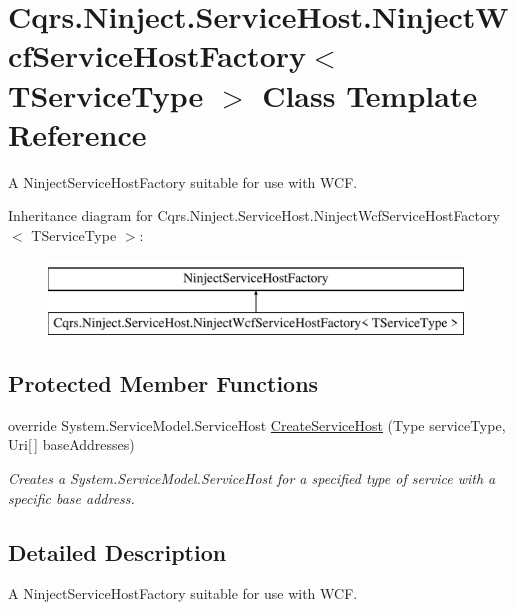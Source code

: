 \hypertarget{classCqrs_1_1Ninject_1_1ServiceHost_1_1NinjectWcfServiceHostFactory}{}\section{Cqrs.\+Ninject.\+Service\+Host.\+Ninject\+Wcf\+Service\+Host\+Factory$<$ T\+Service\+Type $>$ Class Template Reference}
\label{classCqrs_1_1Ninject_1_1ServiceHost_1_1NinjectWcfServiceHostFactory}


A Ninject\+Service\+Host\+Factory suitable for use with W\+CF.  


Inheritance diagram for Cqrs.\+Ninject.\+Service\+Host.\+Ninject\+Wcf\+Service\+Host\+Factory$<$ T\+Service\+Type $>$\+:\begin{figure}[H]
\begin{center}
\leavevmode
\includegraphics[height=2.000000cm]{classCqrs_1_1Ninject_1_1ServiceHost_1_1NinjectWcfServiceHostFactory}
\end{center}
\end{figure}
\subsection*{Protected Member Functions}
\begin{DoxyCompactItemize}
\item 
override System.\+Service\+Model.\+Service\+Host \hyperlink{classCqrs_1_1Ninject_1_1ServiceHost_1_1NinjectWcfServiceHostFactory_aea8f1d5ab6287ef4abf7145d5467cdd5_aea8f1d5ab6287ef4abf7145d5467cdd5}{Create\+Service\+Host} (Type service\+Type, Uri\mbox{[}$\,$\mbox{]} base\+Addresses)
\begin{DoxyCompactList}\small\item\em Creates a System.\+Service\+Model.\+Service\+Host for a specified type of service with a specific base address. \end{DoxyCompactList}\end{DoxyCompactItemize}


\subsection{Detailed Description}
A Ninject\+Service\+Host\+Factory suitable for use with W\+CF. 


